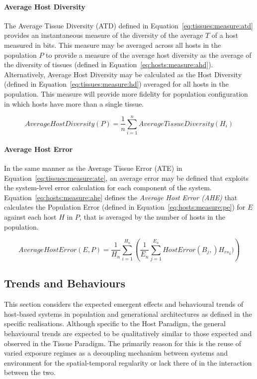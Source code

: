 \paragraph{Average Host Diversity}
The Average Tissue Diversity (ATD) defined in Equation~\ref{eq:tissues:measure:atd} provides an instantaneous measure of the diversity of the average $T$ of a host measured in bits. This measure may be averaged across all hosts in the population $P$ to provide a measure of the average host diversity as the average of the diversity of tissues (defined in Equation~\ref{eq:hosts:measure:ahd}). Alternatively, Average Host Diversity may be calculated as the Host Diversity (defined in Equation~\ref{eq:tissues:measure:hd}) averaged for all hosts in the population. This measure will provide more fidelity for population configuration in which hosts have more than a single tissue. 

\begin{equation}
	AverageHostDiversity(P) = \frac{1}{n}\sum_{i=1}^n AverageTissueDiversity(H_i)
	\label{eq:hosts:measure:ahd}
\end{equation}

%
%
\paragraph{Average Host Error}
In the same manner as the Average Tissue Error (ATE) in Equation~\ref{eq:tissues:measure:ate}, an average error may be defined that exploits the system-level error calculation for each component of the system. Equation~\ref{eq:hosts:measure:ahe} defines the \emph{Average Host Error (AHE)} that calculates the Population Error (defined in Equation~\ref{eq:hosts:measure:pe}) for $E$ against each host $H$ in $P$, that is averaged by the number of hosts in the population.

\begin{equation}
	AverageHostError(E, P) =  
	\frac{1}{H_n} \sum_{i=1}^{H_n}
	\left(\frac{1}{E_n} \sum_{j=1}^{E_n} HostError(B_j, ){H_{rs}}_i)\right)
	\label{eq:hosts:measure:ahe}
\end{equation}


%
%
\subsection{Trends and Behaviours}
\label{subsec:hosts:paradigm:realised:behaviours}
This section considers the expected emergent effects and behavioural trends of host-based systems in population and generational architectures as defined in the specific realisations. Although specific to the Host Paradigm, the general behavioural trends are expected to be qualitatively similar to those expected and observed in the Tissue Paradigm. The primarily reason for this is the reuse of varied exposure regimes as a decoupling mechanism between systems and environment for the spatial-temporal regularity or lack there of in the interaction between the two.

